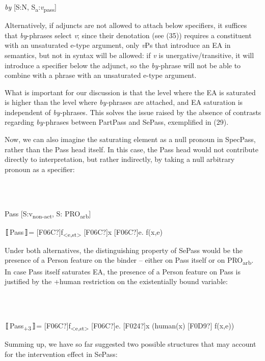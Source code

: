 \documentclass[output=paper]{langsci/langscibook}
\begin{document}
          \textit{by} [S:N, S\textsubscript{a}:\textit{v}\textsubscript{pass}]

Alternatively, if adjuncts are not allowed to attach below specifiers, it suffices that \textit{by}{}-phrases select \textit{v}; since their denotation (see (35)) requires a constituent with an unsaturated e-type argument, only \textit{v}Ps that introduce an EA in semantics, but not in syntax will be allowed: if \textit{v} is unergative/transitive, it will introduce a specifier below the adjunct, so the \textit{by-}phrase will not be able to combine with a phrase with an unsaturated e-type argument.

  What is important for our discussion is that the level where the EA is saturated is higher than the level where \textit{by-}phrases are attached, and EA saturation is independent of \textit{by-}phrases. This solves the issue raised by the absence of contrasts regarding \textit{by-}phrases between PartPass and SePass, exemplified in (29). 

  Now, we can also imagine the saturating element as a null pronoun in SpecPass, rather than the Pass head itself. In this case, the Pass head would not contribute directly to interpretation, but rather indirectly, by taking a null arbitrary pronoun as a specifier:

\ea%
    \label{ex:key:38}
    \gll\\
        \\
    \glt
    \z

          Pass [S:v\textsubscript{non-act}, S: PRO\textsubscript{arb}]

  〚Pass〛=  [F06C?]f\textsubscript{<e,st>} [F06C?]x [F06C?]e. f(x,e)

Under both alternatives, the distinguishing property of SePass would be the presence of a Person feature on the binder – either on Pass itself or on PRO\textsubscript{arb}. In case Pass itself saturates EA, the presence of a Person feature on Pass is justified by the +human restriction on the existentially bound variable:

\ea%
    \label{ex:key:39}
    \gll\\
        \\
    \glt
    \z

          〚Pass\textsubscript{+3}〛= [F06C?]f\textsubscript{<e,st>} [F06C?]e. [F024?]x (human(x) [F0D9?] f(x,e))

Summing up, we have so far suggested two possible structures that may account for the intervention effect in SePass:
\end{document}
